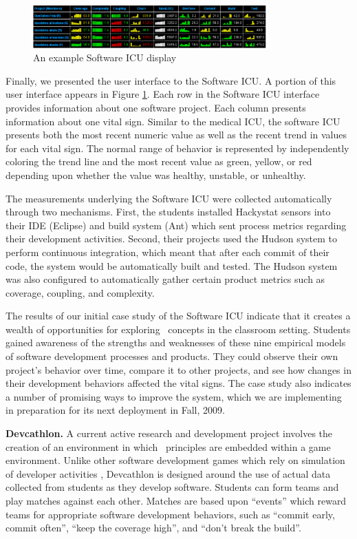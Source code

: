 \begin{figure}[ht]
  \center
  \includegraphics[width=0.8\textwidth]{portfolio-2008.eps}
  \caption{An example Software ICU display}
  \label{fig:sicu}
\end{figure} 

Finally, we presented the user interface to the Software ICU. A portion of
this user interface appears in Figure \ref{fig:sicu}.  Each row in the
Software ICU interface provides information about one software project.
Each column presents information about one vital sign. Similar to the
medical ICU, the software ICU presents both the most recent numeric value
as well as the recent trend in values for each vital sign.  The normal range
of behavior is represented by independently coloring the trend line and the
most recent value as green, yellow, or red depending upon whether the value
was healthy, unstable, or unhealthy.  

The measurements underlying the Software ICU were collected automatically
through two mechanisms. First, the students installed Hackystat sensors
into their IDE (Eclipse) and build system (Ant) which sent process
metrics regarding their development activities.  Second, their projects
used the Hudson system to perform continuous integration, which meant that
after each commit of their code, the system would be automatically built
and tested.  The Hudson system was also configured to automatically gather
certain product metrics such as coverage, coupling, and complexity.

The results of our initial case study of the Software ICU indicate that it
creates a wealth of opportunities for exploring \eCT\ concepts in the
classroom setting. Students gained awareness of the strengths and
weaknesses of these nine empirical models of software development processes
and products. They could observe their own project's behavior over time,
compare it to other projects, and see how changes in their development
behaviors affected the vital signs.  The case study also indicates a number
of promising ways to improve the system, which we are implementing in
preparation for its next deployment in Fall, 2009.

{\bf Devcathlon.} A current active research and development project
involves the creation of an environment in which \eCT\ principles are
embedded within a game environment.  Unlike other software development
games which rely on simulation of developer activities
\citep{Drappa00,Navarro09,Jain06}, Devcathlon is designed around the use of actual
data collected from students as they develop software.  Students can form
teams and play matches against each other.  Matches are based upon
``events'' which reward teams for appropriate software development
behaviors, such as ``commit early, commit often'', ``keep the coverage
high'', and ``don't break the build''.

